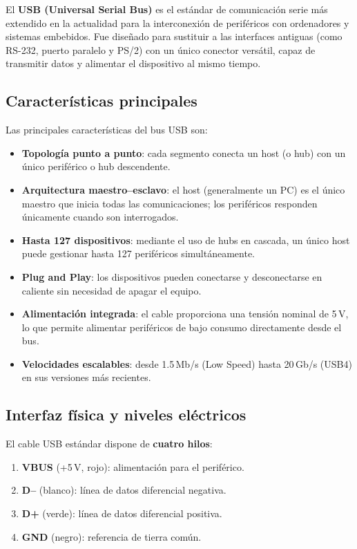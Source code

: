 El \textbf{USB (Universal Serial Bus)} es el estándar de comunicación serie más extendido en la actualidad para la interconexión de periféricos con ordenadores y sistemas embebidos. Fue diseñado para sustituir a las interfaces antiguas (como RS-232, puerto paralelo y PS/2) con un único conector versátil, capaz de transmitir datos y alimentar el dispositivo al mismo tiempo.

\subsection{Características principales}

Las principales características del bus USB son:
\begin{itemize}
    \item \textbf{Topología punto a punto}: cada segmento conecta un host (o hub) con un único periférico o hub descendente.
    \item \textbf{Arquitectura maestro--esclavo}: el host (generalmente un PC) es el único maestro que inicia todas las comunicaciones; los periféricos responden únicamente cuando son interrogados.
    \item \textbf{Hasta 127 dispositivos}: mediante el uso de hubs en cascada, un único host puede gestionar hasta 127 periféricos simultáneamente.
    \item \textbf{Plug and Play}: los dispositivos pueden conectarse y desconectarse en caliente sin necesidad de apagar el equipo.
    \item \textbf{Alimentación integrada}: el cable proporciona una tensión nominal de 5\,V, lo que permite alimentar periféricos de bajo consumo directamente desde el bus.
    \item \textbf{Velocidades escalables}: desde 1.5\,Mb/s (Low Speed) hasta 20\,Gb/s (USB4) en sus versiones más recientes.
\end{itemize}

\subsection{Interfaz física y niveles eléctricos}

El cable USB estándar dispone de \textbf{cuatro hilos}:
\begin{enumerate}
    \item \textbf{VBUS} (+5\,V, rojo): alimentación para el periférico.
    \item \textbf{D--} (blanco): línea de datos diferencial negativa.
    \item \textbf{D+} (verde): línea de datos diferencial positiva.
    \item \textbf{GND} (negro): referencia de tierra común.
\end{enumerate}

